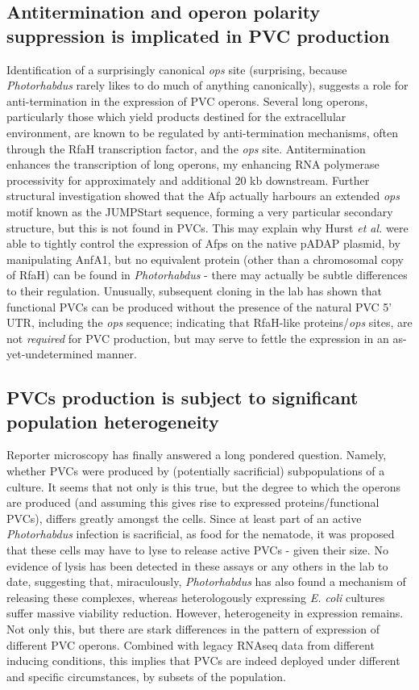 \subsection{Antitermination and operon polarity suppression is implicated in PVC production}
Identification of a surprisingly canonical \emph{ops} site (surprising, because \emph{Photorhabdus} rarely likes to do much of anything canonically), suggests a role for anti-termination in the expression of PVC operons. Several long operons, particularly those which yield products destined for the extracellular environment, are known to be regulated by anti-termination mechanisms, often through the RfaH transcription factor, and the \emph{ops} site. Antitermination enhances the transcription of long operons, my enhancing RNA polymerase processivity for approximately and additional 20 kb downstream. Further structural investigation showed that the Afp actually harbours an extended \emph{ops} motif known as the JUMPStart sequence, forming a very particular secondary structure, but this is not found in PVCs. This may explain why Hurst \emph{et al.} were able to tightly control the expression of Afps on the native pADAP plasmid, by manipulating AnfA1, but no equivalent protein (other than a chromosomal copy of RfaH) can be found in \emph{Photorhabdus} - there may actually be subtle differences to their regulation. Unusually, subsequent cloning in the lab has shown that functional PVCs can be produced without the presence of the natural PVC 5' UTR, including the \emph{ops} sequence; indicating that RfaH-like proteins/\emph{ops} sites, are not \emph{required} for PVC production, but may serve to fettle the expression in an as-yet-undetermined manner.

\subsection{PVCs production is subject to significant population heterogeneity}
Reporter microscopy has finally answered a long pondered question. Namely, whether PVCs were produced by (potentially sacrificial) subpopulations of a culture. It seems that not only is this true, but the degree to which the operons are produced (and assuming this gives rise to expressed proteins/functional PVCs), differs greatly amongst the cells. Since at least part of an active \emph{Photorhabdus} infection is sacrificial, as food for the nematode, it was proposed that these cells may have to lyse to release active PVCs - given their size. No evidence of lysis has been detected in these assays or any others in the lab to date, suggesting that, miraculously, \emph{Photorhabdus} has also found a mechanism of releasing these complexes, whereas heterologously expressing \emph{E. coli} cultures suffer massive viability reduction. However, heterogeneity in expression remains. Not only this, but there are stark differences in the pattern of expression of different PVC operons. Combined with legacy RNAseq data from different inducing conditions, this implies that PVCs are indeed deployed under different and specific circumstances, by subsets of the population.



